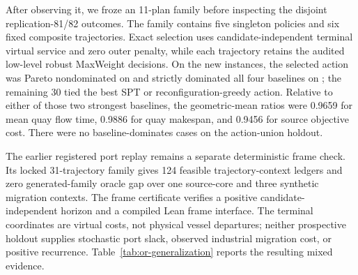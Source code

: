 \documentclass[opre,dblanonrev]{informs4}
\begin{document}
After observing it, we froze an 11-plan family before inspecting the disjoint
replication-81/82 outcomes.  The family contains five singleton policies and six
fixed composite trajectories.  Exact selection uses candidate-independent
terminal virtual service and zero outer penalty, while each trajectory retains
the audited low-level robust MaxWeight decisions.  On the
\PortUnionInstanceCount{} new instances, the selected action was Pareto
nondominated on \PortUnionNondominatedCount{} and strictly dominated all four
baselines on \PortUnionStrictAllCount{}; the remaining 30 tied the best SPT or
reconfiguration-greedy action.  Relative to either of those two strongest
baselines, the geometric-mean ratios were 0.9659 for mean quay flow time,
0.9886 for quay makespan, and 0.9456 for source objective cost.  There were no
baseline-dominates cases on the action-union holdout.

The earlier registered port replay remains a separate deterministic frame
check.  Its locked 31-trajectory family gives 124 feasible trajectory-context
ledgers and zero generated-family oracle gap over one source-core and three
synthetic migration contexts.  The frame certificate verifies a positive
candidate-independent horizon and a compiled Lean frame interface.  The
terminal coordinates are virtual costs, not physical vessel departures;
neither prospective holdout supplies stochastic port slack, observed industrial
migration cost, or positive recurrence.
Table~\ref{tab:or-generalization} reports the resulting mixed evidence.
\end{document}
